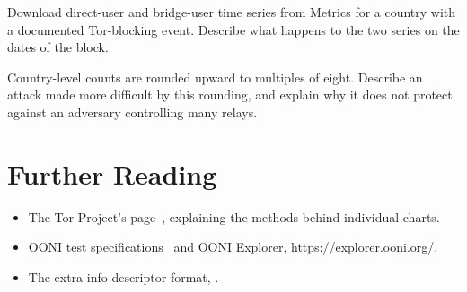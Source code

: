 \begin{esercizio}[2]\label{es:24-censura}
Download direct-user and bridge-user time series from Metrics for a country with a documented Tor-blocking event. Describe what happens to the two series on the dates of the block.
\end{esercizio}

\begin{esercizio}[3]\label{es:24-privacy}
Country-level counts are rounded upward to multiples of eight. Describe an attack made more difficult by this rounding, and explain why it does not protect against an adversary controlling many relays.
\end{esercizio}

\section*{Further Reading}
\begin{itemize}
  \item The Tor Project's  page~\cite{metricsreproducible}, explaining the methods behind individual charts.
  \item OONI test specifications~\cite{oonitor} and OONI Explorer, \url{https://explorer.ooni.org/}.
  \item The extra-info descriptor format, .
\end{itemize}
